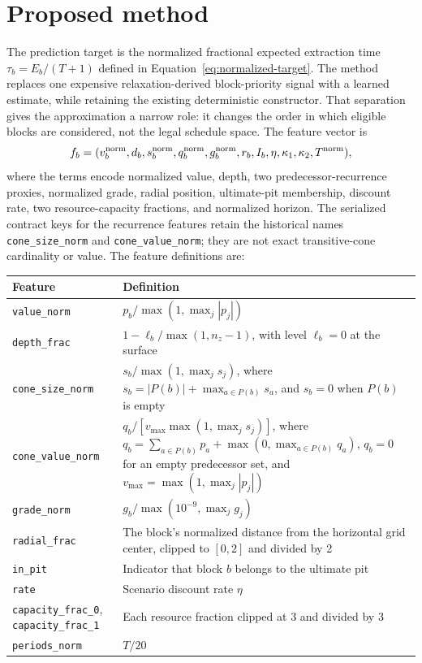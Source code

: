 \documentclass[11pt]{article}
\begin{document}
\section{Proposed method}
\label{sec:proposed-method}
The prediction target is the normalized fractional expected extraction time $\tau_b=E_b/(T+1)$ defined in Equation~\ref{eq:normalized-target}. The method replaces one expensive relaxation-derived block-priority signal with a learned estimate, while retaining the existing deterministic constructor. That separation gives the approximation a narrow role: it changes the order in which eligible blocks are considered, not the legal schedule space. The feature vector is
\begin{equation}
f_b=(v_b^{\rm norm}, d_b, s_b^{\rm norm}, q_b^{\rm norm}, g_b^{\rm norm}, r_b, I_b, \eta, \kappa_1, \kappa_2, T^{\rm norm}),
\label{eq:features}
\end{equation}
where the terms encode normalized value, depth, two predecessor-recurrence proxies, normalized grade, radial position, ultimate-pit membership, discount rate, two resource-capacity fractions, and normalized horizon. The serialized contract keys for the recurrence features retain the historical names \texttt{cone\_size\_norm} and \texttt{cone\_value\_norm}; they are not exact transitive-cone cardinality or value. The feature definitions are:
\begin{center}
\small
\begin{tabular}{>{\raggedright\arraybackslash}p{}>{\raggedright\arraybackslash}p{}}\toprule
Feature & Definition \\\midrule
\texttt{value\_norm} & $p_b/\max(1,\max_j|p_j|)$ \\
\texttt{depth\_frac} & $1-\ell_b/\max(1,n_z-1)$, with level $\ell_b=0$ at the surface \\
\texttt{cone\_size\_norm} & $s_b/\max(1,\max_j s_j)$, where $s_b=|P(b)|+\max_{a\in P(b)}s_a$, and $s_b=0$ when $P(b)$ is empty \\
\texttt{cone\_value\_norm} & $q_b/[v_{\max}\max(1,\max_j s_j)]$, where $q_b=\sum_{a\in P(b)}p_a+\max(0,\max_{a\in P(b)}q_a)$, $q_b=0$ for an empty predecessor set, and $v_{\max}=\max(1,\max_j|p_j|)$ \\
\texttt{grade\_norm} & $g_b/\max(10^{-9},\max_j g_j)$ \\
\texttt{radial\_frac} & The block's normalized distance from the horizontal grid center, clipped to $[0,2]$ and divided by 2 \\
\texttt{in\_pit} & Indicator that block $b$ belongs to the ultimate pit \\
\texttt{rate} & Scenario discount rate $\eta$ \\
\texttt{capacity\_frac\_0}, \texttt{capacity\_frac\_1} & Each resource fraction clipped at 3 and divided by 3 \\
\texttt{periods\_norm} & $T/20$ \\\bottomrule
\end{tabular}
\end{center}
\end{document}
